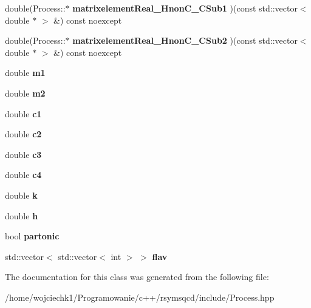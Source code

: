 \begin{DoxyCompactItemize}
\item 
\mbox{\label{classProcess_ad6133fbfba8ef70546c53c9010dafdc1}} 
double(Process\+::$\ast$ {\bfseries matrixelement\+Real\+\_\+\+Hnon\+C\+\_\+\+C\+Sub1} )(const std\+::vector$<$ double $\ast$ $>$ \&) const noexcept
\item 
\mbox{\label{classProcess_aa735bcf530026221f049f102322c8663}} 
double(Process\+::$\ast$ {\bfseries matrixelement\+Real\+\_\+\+Hnon\+C\+\_\+\+C\+Sub2} )(const std\+::vector$<$ double $\ast$ $>$ \&) const noexcept
\item 
\mbox{\label{classProcess_ae6061019e1064a2432eee55d2328fba6}} 
double {\bfseries m1}
\item 
\mbox{\label{classProcess_a41cd2505bff11029ebfb9d0c0eba6ede}} 
double {\bfseries m2}
\item 
\mbox{\label{classProcess_a3f78ea46255307582d1e307ae313849b}} 
double {\bfseries c1}
\item 
\mbox{\label{classProcess_a96dc47c8f523deadce142b932368b48b}} 
double {\bfseries c2}
\item 
\mbox{\label{classProcess_a49ef9dba94bed258c341478a23b0ec34}} 
double {\bfseries c3}
\item 
\mbox{\label{classProcess_ae2b68f8da651b064da1ed312d689fcb8}} 
double {\bfseries c4}
\item 
\mbox{\label{classProcess_ac00a109bebb0ef93f0b254a0ab708de6}} 
double {\bfseries k}
\item 
\mbox{\label{classProcess_ae15ca69e10cabf342b2b653ddf4d2076}} 
double {\bfseries h}
\item 
\mbox{\label{classProcess_ac1eb1e163b010b3044fb464213f053b8}} 
bool {\bfseries partonic}
\item 
\mbox{\label{classProcess_aeb33669fd7dc8c84321f2e26c796a0f9}} 
std\+::vector$<$ std\+::vector$<$ int $>$ $>$ {\bfseries flav}
\end{DoxyCompactItemize}


The documentation for this class was generated from the following file\+:\begin{DoxyCompactItemize}
\item 
/home/wojciechk1/\+Programowanie/c++/rsymsqcd/include/Process.\+hpp\end{DoxyCompactItemize}
